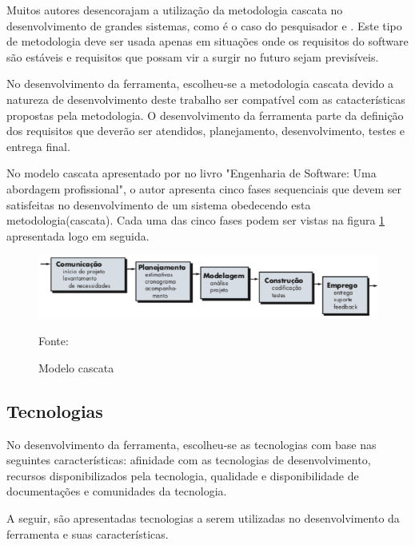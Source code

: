 Muitos autores desencorajam a utilização da metodologia cascata no desenvolvimento de grandes sistemas, como é o caso do pesquisador
  e . Este tipo de metodologia deve ser usada apenas em situações onde os requisitos do software são estáveis e requisitos
que possam vir a surgir no futuro sejam previsíveis. \cite{semedo2012ganhos}

No desenvolvimento da ferramenta, escolheu-se a metodologia cascata devido a natureza de desenvolvimento deste trabalho ser compatível com as 
catacterísticas propostas pela metodologia. O desenvolvimento da ferramenta parte da definição dos requisitos que deverão
ser atendidos, planejamento, desenvolvimento, testes e entrega final.

No modelo cascata apresentado por  no livro "Engenharia de Software: Uma abordagem profissional", o autor
apresenta cinco fases sequenciais que devem ser satisfeitas no desenvolvimento de um sistema obedecendo esta metodologia(cascata). 
Cada uma das cinco fases podem ser vistas na figura \ref{cascata} apresentada logo em seguida.

\begin{figure}[h]
	\centering
	\includegraphics[keepaspectratio=true,scale=0.6]{figuras/cascata.png}
	\caption{Modelo cascata}
	Fonte: \cite{pressman}
	\label{cascata}
\end{figure}


\subsection{Tecnologias}

No desenvolvimento da ferramenta, escolheu-se as tecnologias com base nas seguintes características: afinidade
com as tecnologias de desenvolvimento, recursos disponibilizados pela tecnologia, qualidade e disponibilidade
de documentações e comunidades da tecnologia.

A seguir, são apresentadas tecnologias a serem utilizadas no desenvolvimento da ferramenta e suas características.

